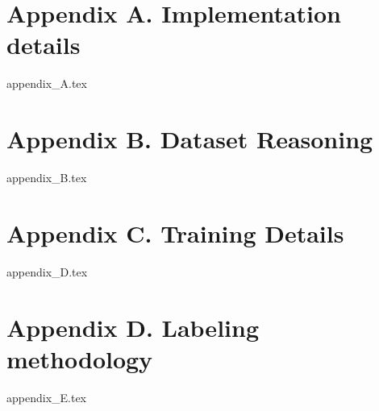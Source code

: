 \documentclass[runningheads]{llncs}
\begin{document}
\section*{Appendix A. Implementation details}
{appendix_A.tex}

\section*{Appendix B. Dataset Reasoning}
{appendix_B.tex}



\section*{Appendix C. Training Details}
{appendix_D.tex}

\section*{Appendix D. Labeling methodology}
{appendix_E.tex}
\end{document}
